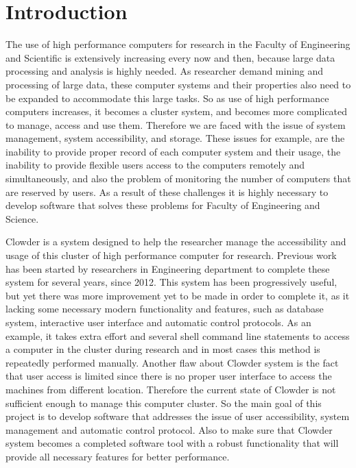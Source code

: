 \chapter{Introduction}

The use of high performance computers for  research in the Faculty of Engineering  and Scientific is extensively increasing  every now and then, because large data processing and analysis is highly needed. As researcher demand mining and processing of large data, these computer systems and their properties  also need to be expanded to accommodate this large tasks. So as use of high performance computers increases, it becomes a cluster system, and becomes more complicated to manage, access and use them. Therefore we are faced with the issue of system management, system accessibility, and storage. These issues for example, are the inability to provide proper record of each computer system and their usage, the inability to provide flexible users access to the computers remotely and simultaneously, and also the problem of monitoring the number of computers that are reserved by users. As a result of these challenges it is highly necessary to develop software that solves these problems for Faculty of Engineering and Science. 


Clowder is a system designed to help the researcher manage the accessibility and usage of this cluster of high performance computer for research. Previous work has been started by researchers in Engineering department to complete these system for several years, since 2012. This system has been progressively useful, but yet there was more improvement yet to be made in order to complete it, as it lacking some necessary modern functionality and features, such as database system, interactive user interface  and automatic control protocols.  As an example, it takes extra effort and several shell command line statements to access  a computer in the cluster during research and in most cases this method is repeatedly performed manually. Another flaw about Clowder system is the fact that user access is limited since there is no proper user interface to access the machines from different location. Therefore the current state of Clowder is not sufficient enough to manage this computer cluster. So the main goal of this project is to develop software that addresses the issue of user accessibility, system management and automatic control protocol. Also to make sure that Clowder system becomes a completed software tool with a robust functionality that will provide all necessary features for better performance. 
	
